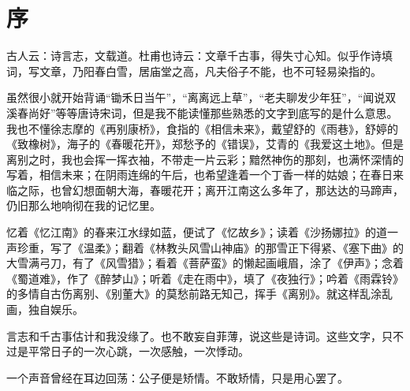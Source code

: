 \chapter{序}

古人云：诗言志，文载道。杜甫也诗云：文章千古事，得失寸心知。似乎作诗填词，写文章，乃阳春白雪，居庙堂之高，凡夫俗子不能，也不可轻易染指的。

虽然很小就开始背诵“锄禾日当午”，“离离远上草”，“老夫聊发少年狂”，“闻说双溪春尚好”等等唐诗宋词，但是我不能读懂那些熟悉的文字到底写的是什么意思。我也不懂徐志摩的《再别康桥》，食指的《相信未来》，戴望舒的《雨巷》，舒婷的《致橡树》，海子的《春暖花开》，郑愁予的《错误》，艾青的《我爱这土地》。但是离别之时，我也会挥一挥衣袖，不带走一片云彩；黯然神伤的那刻，也满怀深情的写着，相信未来；在阴雨连绵的午后，也希望逢着一个丁香一样的姑娘；在春日来临之际，也曾幻想面朝大海，春暖花开；离开江南这么多年了，那达达的马蹄声，仍旧那么地响彻在我的记忆里。

忆着《忆江南》的春来江水绿如蓝，便试了《忆故乡》；读着《沙扬娜拉》的道一声珍重，写了《温柔》；翻着《林教头风雪山神庙》的那雪正下得紧、《塞下曲》的大雪满弓刀，有了《风雪猎》；看着《菩萨蛮》的懒起画峨眉，涂了《伊声》；念着《蜀道难》，作了《醉梦山》；听着《走在雨中》，填了《夜独行》；吟着《雨霖铃》的多情自古伤离别、《别董大》的莫愁前路无知己，挥手《离别》。就这样乱涂乱画，独自娱乐。

言志和千古事估计和我没缘了。也不敢妄自菲薄，说这些是诗词。这些文字，只不过是平常日子的一次心跳，一次感触，一次悸动。

一个声音曾经在耳边回荡：公子便是矫情。不敢矫情，只是用心罢了。
